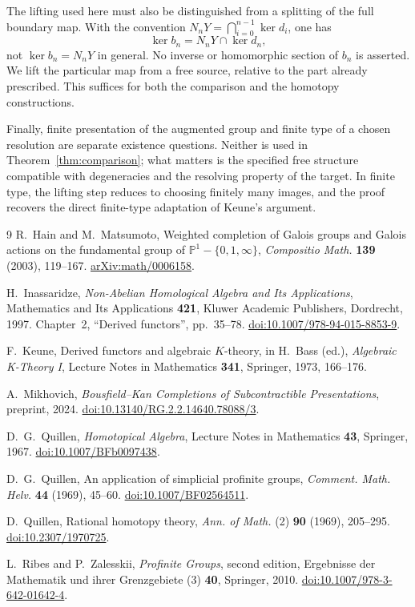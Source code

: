\documentclass[11pt,a4paper]{article}
\theoremstyle{definition}
\begin{document}
The lifting used here must also be distinguished from a splitting of the
full boundary map. With the convention
$N_nY=\bigcap_{i=0}^{n-1}\ker d_i$, one has
\[
 \ker b_n=N_nY\cap\ker d_n,
\]
not $\ker b_n=N_nY$ in general. No inverse or homomorphic section of
$b_n$ is asserted. We lift the particular map from a free source,
relative to the part already prescribed. This suffices for both the
comparison and the homotopy constructions.

Finally, finite presentation of the augmented group and finite type of
a chosen resolution are separate existence questions. Neither is used
in Theorem~\ref{thm:comparison}; what matters is the specified free
structure compatible with degeneracies and the resolving property of
the target. In finite type, the lifting step reduces to choosing
finitely many images, and the proof recovers the direct finite-type
adaptation of Keune's argument.

\begin{thebibliography}{9}
R.~Hain and M.~Matsumoto,
Weighted completion of Galois groups and Galois actions on the
fundamental group of $\mathbb P^1-\{0,1,\infty\}$,
\emph{Compositio Math.} \textbf{139} (2003), 119--167.
\href{https://arxiv.org/abs/math/0006158}{arXiv:math/0006158}.

H.~Inassaridze, \emph{Non-Abelian Homological Algebra and Its Applications},
Mathematics and Its Applications \textbf{421},
Kluwer Academic Publishers, Dordrecht, 1997.
Chapter~2, ``Derived functors'', pp.~35--78.
\href{https://doi.org/10.1007/978-94-015-8853-9}{doi:10.1007/978-94-015-8853-9}.

F.~Keune, Derived functors and algebraic $K$-theory,
in H.~Bass (ed.), \emph{Algebraic K-Theory I},
Lecture Notes in Mathematics \textbf{341}, Springer, 1973, 166--176.

A.~Mikhovich, \emph{Bousfield--Kan Completions of Subcontractible
Presentations}, preprint, 2024.
\href{https://doi.org/10.13140/RG.2.2.14640.78088/3}{doi:10.13140/RG.2.2.14640.78088/3}.

D.~G.~Quillen, \emph{Homotopical Algebra},
Lecture Notes in Mathematics \textbf{43}, Springer, 1967.
\href{https://doi.org/10.1007/BFb0097438}{doi:10.1007/BFb0097438}.

D.~G.~Quillen, An application of simplicial profinite groups,
\emph{Comment. Math. Helv.} \textbf{44} (1969), 45--60.
\href{https://doi.org/10.1007/BF02564511}{doi:10.1007/BF02564511}.

D.~Quillen, Rational homotopy theory,
\emph{Ann. of Math.} (2) \textbf{90} (1969), 205--295.
\href{https://doi.org/10.2307/1970725}{doi:10.2307/1970725}.

L.~Ribes and P.~Zalesskii, \emph{Profinite Groups}, second edition,
Ergebnisse der Mathematik und ihrer Grenzgebiete (3) \textbf{40},
Springer, 2010.
\href{https://doi.org/10.1007/978-3-642-01642-4}{doi:10.1007/978-3-642-01642-4}.
\end{thebibliography}
\end{document}
